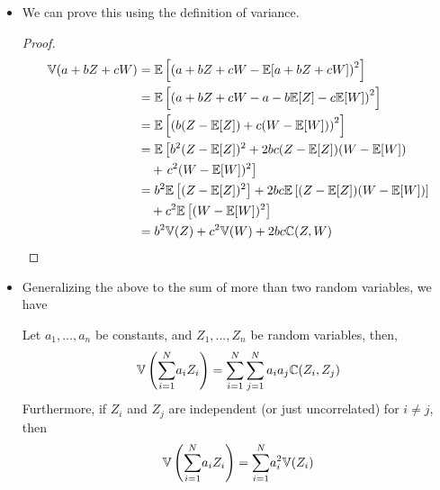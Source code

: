 \begin{frame}[shrink]

\begin{itemize}
\item We can prove this using the definition of variance. 

\begin{proof}
  
  \begin{align*}
    \mathbb{V}(a + bZ + cW) & =  \mathbb{E}\left[ \left(a + bZ + cW - \mathbb{E}[a + bZ + cW]\right)^2 \right] \\
    &=  \mathbb{E}\left[ \left(a + bZ + cW - a - b\mathbb{E}[Z] - c\mathbb{E}[W]\right)^2
    \right] \\
    &=  \mathbb{E}\left[\left(b(Z - \mathbb{E}[Z]) + c(W - \mathbb{E}[W]) \right)^2 \right]
    \\
    &=  \mathbb{E}\left[ b^2 (Z - \mathbb{E}[Z])^2 + 2bc (Z - \mathbb{E}[Z])(W - \mathbb{E}[W])\right. \\
     &\ \ \ +
      \left. c^2 (W - \mathbb{E}[W])^2 \right] \\
    &=  b^2\mathbb{E}\left[  (Z - \mathbb{E}[Z])^2\right] + 2bc \mathbb{E}\left[ (Z - \mathbb{E}[Z])(W - \mathbb{E}[W]) \right]\\
    &\ \ \  +
    c^2 \mathbb{E}\left[ (W - \mathbb{E}[W])^2 \right] \\
    &=  b^2 \mathbb{V}(Z) + c^2 \mathbb{V}(W) + 2 bc \mathbb{C}(Z,W)
  \end{align*}
\end{proof}
\end{itemize}
\end{frame}

\begin{frame}

\begin{itemize}
\item  Generalizing the above to the sum of more than two random variables,
we have
\begin{corollary}
  Let $a_1, ..., a_n$ be constants, and $Z_1, ..., Z_n$ be random
  variables, then,
  \[
  \mathbb{V}\left( {\sum_{i=1}^N} a_i Z_i \right)  = {\sum_{i=1}^N} \sum_{j=1}^N a_i a_j
  \mathbb{C}(Z_i, Z_j) 
  \]
  Furthermore, if $Z_i$ and $Z_j$ are independent (or just
  uncorrelated) for $i \neq j$, then
  \[
  \mathbb{V}\left( {\sum_{i=1}^N} a_i Z_i \right)  = {\sum_{i=1}^N} a_i^2 \mathbb{V}(Z_i)
  \]
\end{corollary}

 \end{itemize}
\end{frame}

